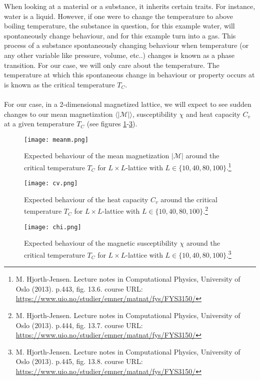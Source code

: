 \documentclass[reprint,english,notitlepage]{revtex4-1}  %
\begin{document}
When looking at a material or a substance, it inherits certain traits. For instance, water is a liquid. However, if one were to change the temperature to above boiling temperature, the substance in question, for this example water, will spontaneously change behaviour, and for this example turn into a gas. This process of a substance spontaneously changing behaviour when temperature (or any other variable like pressure, volume, etc..) changes is known as a phase transition. For our case, we will only care about the temperature. The temperature at which this spontaneous change in behaviour or property occurs at is known as the critical temperature $T_C$.
\\
\\
For our case, in a 2-dimensional magnetized lattice, we will expect to see sudden changes to our mean magnetization $\langle |\mathcal{M}|\rangle$, susceptibility $\chi$ and heat capacity $C_v$ at a given temperature $T_C$ (see figures \ref{fig:meanMillu}-\ref{fig:chiILLU}).
\begin{figure}[h!]
    \centering
    \texttt{[image: meanm.png]}
    \caption{Expected behaviour of the mean magnetization $|\mathcal{M}|$ around the critical temperature $T_C$ for $L\times L$-lattice with $L \in \{10,40,80,100\}$.\footnote{M. Hjorth-Jensen. Lecture notes in Computational Physics, University of Oslo (2013). p.443, fig. 13.6. course URL: \url{https://www.uio.no/studier/emner/matnat/fys/FYS3150/}}}
    \label{fig:meanMillu}
\end{figure}
\begin{figure}[h!]
    \centering
    \texttt{[image: cv.png]}
    \caption{Expected behaviour of the heat capacity $C_v$ around the critical temperature $T_C$ for $L\times L$-lattice with $L \in \{10,40,80,100\}$.\footnote{M. Hjorth-Jensen. Lecture notes in Computational Physics, University of Oslo (2013). p.444, fig. 13.7. course URL: \url{https://www.uio.no/studier/emner/matnat/fys/FYS3150/}}}
    \label{fig:leeeeeel}
\end{figure}
\begin{figure}[h!]
    \centering
    \texttt{[image: chi.png]}
    \caption{Expected behaviour of the magnetic susceptibility $\chi$ around the critical temperature $T_C$ for $L\times L$-lattice with $L \in \{10,40,80,100\}$.\footnote{M. Hjorth-Jensen. Lecture notes in Computational Physics, University of Oslo (2013). p.445, fig. 13.8. course URL: \url{https://www.uio.no/studier/emner/matnat/fys/FYS3150/}}}
    \label{fig:chiILLU}
\end{figure}
\end{document}
